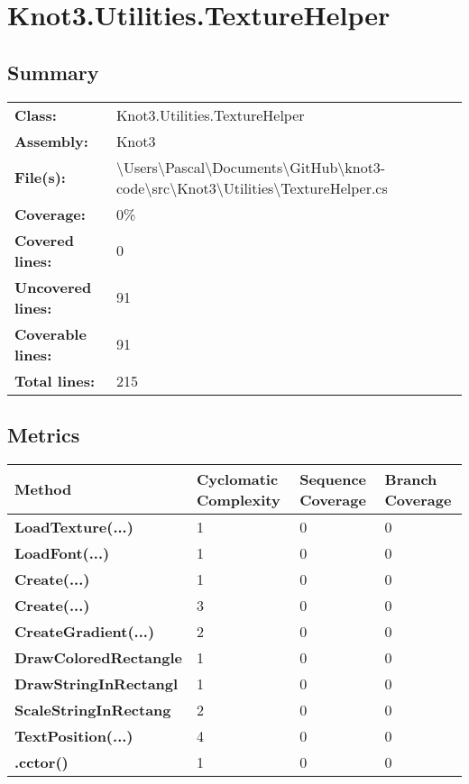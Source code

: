 \documentclass[a4paper,10pt]{article}
\begin{document}
\section{Knot3.Utilities.TextureHelper}
\subsection{Summary}
\begin{longtable}[l]{ll}
\textbf{Class:} & Knot3.Utilities.TextureHelper\\
\textbf{Assembly:} & Knot3\\
\textbf{File(s):} & \begin{minipage}[t]{12cm}{\textbackslash Users\textbackslash Pascal\textbackslash Documents\textbackslash GitHub\textbackslash knot3-code\textbackslash src\textbackslash Knot3\textbackslash Utilities\textbackslash TextureHelper.cs}\end{minipage} \\
\textbf{Coverage:} & 0\%\\
\textbf{Covered lines:} & 0\\
\textbf{Uncovered lines:} & 91\\
\textbf{Coverable lines:} & 91\\
\textbf{Total lines:} & 215\\
\end{longtable}
\subsection{Metrics}
\begin{longtable}[l]{|l|l|l|l|}
\hline
\textbf{Method} & \textbf{Cyclomatic Complexity} & \textbf{Sequence Coverage} & \textbf{Branch Coverage}\\
\hline
\textbf{LoadTexture(...)} & 1 & 0 & 0\\
\hline
\textbf{LoadFont(...)} & 1 & 0 & 0\\
\hline
\textbf{Create(...)} & 1 & 0 & 0\\
\hline
\textbf{Create(...)} & 3 & 0 & 0\\
\hline
\textbf{CreateGradient(...)} & 2 & 0 & 0\\
\hline
\textbf{DrawColoredRectangle} & 1 & 0 & 0\\
\hline
\textbf{DrawStringInRectangl} & 1 & 0 & 0\\
\hline
\textbf{ScaleStringInRectang} & 2 & 0 & 0\\
\hline
\textbf{TextPosition(...)} & 4 & 0 & 0\\
\hline
\textbf{.cctor()} & 1 & 0 & 0\\
\hline
\end{longtable}
\end{document}
